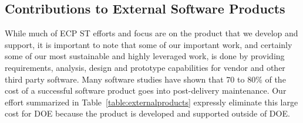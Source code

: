 \subsection{Contributions to External Software Products}\label{subsection:external-contributions}
While much of ECP ST efforts and focus are on the product that we develop and support, it is important to note that some of our important work, and certainly some of our most sustainable and highly leveraged work, is done by providing requirements, analysis, design and prototype capabilities for vendor and other third party software.  Many software studies have shown that 70 to 80\% of the cost of a successful software product goes into post-delivery maintenance. Our effort summarized in Table~\ref{table:externalproducts} expressly eliminate this large cost for DOE because the product is developed and supported outside of DOE.


